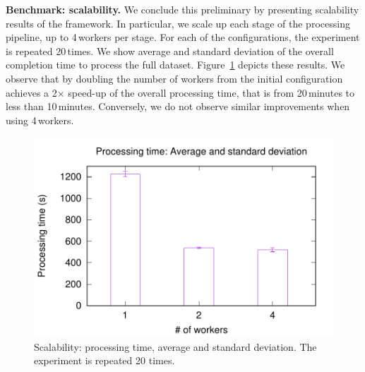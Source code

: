 
\textbf{Benchmark: scalability.} We conclude this preliminary by presenting scalability results of the \SYS framework.
In particular, we scale up each stage of the processing pipeline, up to 4\,workers per stage.
For each of the configurations, the experiment is repeated 20\,times.
We show average and standard deviation of the overall completion time to process the full dataset.
Figure~\ref{fig:scalability} depicts these results.
We observe that by doubling the number of workers from the initial configuration achieves a 2$\times$ speed-up of the overall processing time, that is from 20\,minutes to less than 10\,minutes.
Conversely, we do not observe similar improvements when using 4\,workers.

\begin{figure}[t!]
  \centering
  \includegraphics[scale=0.5]{images/avg_stdev_4_streams}
  \caption{Scalability: processing time, average and standard deviation. The experiment is repeated 20 times.}
  \label{fig:scalability}
\end{figure}


